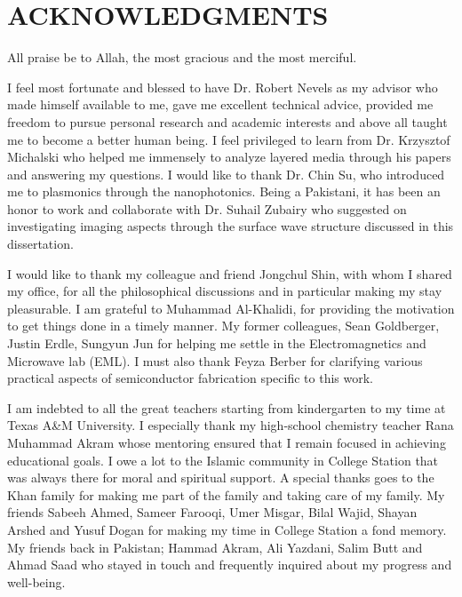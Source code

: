 %
%
%


\chapter*{ACKNOWLEDGMENTS}


\indent All praise be to Allah, the most gracious and the most merciful.

I feel most fortunate and blessed to have Dr. Robert Nevels as my advisor who  made himself available to me, gave me excellent technical advice, provided me freedom to pursue personal research and academic interests and above all taught me to become a better human being. I feel privileged to learn from Dr. Krzysztof Michalski who helped me immensely to analyze layered media through his papers and answering my questions. I would like to thank Dr. Chin Su, who introduced me to plasmonics through the nanophotonics. Being a Pakistani, it has been an honor to work and collaborate with Dr. Suhail Zubairy who suggested on investigating imaging aspects through the surface wave structure discussed in this dissertation.

I would like to thank my colleague and friend Jongchul Shin, with whom I shared my office, for all the philosophical discussions and in particular making my stay pleasurable. I am grateful to Muhammad Al-Khalidi, for providing the motivation to get things done in a timely manner. My former colleagues, Sean Goldberger, Justin Erdle, Sungyun Jun for helping me settle in the Electromagnetics and Microwave lab (EML). I must also thank Feyza Berber for clarifying various practical aspects of semiconductor fabrication specific to this work.

I am indebted to all the great teachers starting from kindergarten to my time at Texas A\&M University. I especially thank my high-school chemistry teacher Rana Muhammad Akram whose mentoring ensured that I remain focused in achieving educational goals. I owe a lot to the Islamic community in College Station that was always there for moral and spiritual support. A special thanks goes to the Khan family for making me part of the family and taking care of my family. My friends Sabeeh Ahmed, Sameer Farooqi, Umer Misgar, Bilal Wajid, Shayan Arshed and Yusuf Dogan for making my time in College Station a fond memory. My friends back in Pakistan; Hammad Akram, Ali Yazdani, Salim Butt and Ahmad Saad who stayed in touch and frequently inquired about my progress and well-being.

